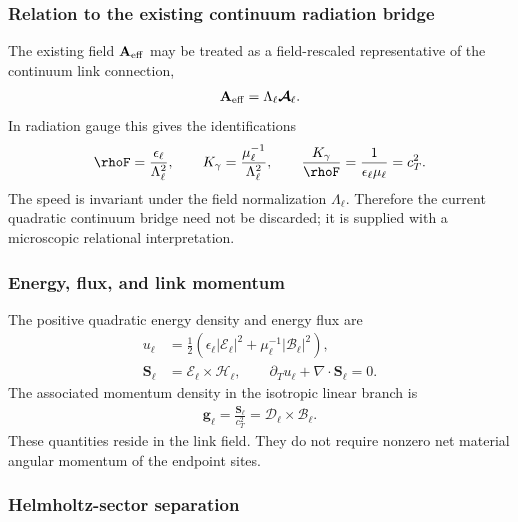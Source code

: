 \subsubsection{Relation to the existing continuum radiation bridge}

The existing field $\mathbf A_{\rm eff}$ may be treated as a field-rescaled
representative of the continuum link connection,
\begin{align}
    \mathbf A_{\rm eff}
    =
    \Lambda_\ell\boldsymbol{\mathcal A}_\ell.
\end{align}
In radiation gauge this gives the identifications
\begin{align}
    \rhoF
    =
    \frac{\epsilon_\ell}{\Lambda_\ell^2},
    \qquad
    K_\gamma
    =
    \frac{\mu_\ell^{-1}}{\Lambda_\ell^2},
    \qquad
    \frac{K_\gamma}{\rhoF}
    =
    \frac{1}{\epsilon_\ell\mu_\ell}
    =c_T^2.
    \label{eq:rt_link_to_Aeff_normalization}
\end{align}
The speed is invariant under the field normalization $\Lambda_\ell$.  Therefore
the current quadratic continuum bridge need not be discarded; it is supplied
with a microscopic relational interpretation.

\subsubsection{Energy, flux, and link momentum}

The positive quadratic energy density and energy flux are
\begin{align}
    u_\ell
    &=
    \frac12
    \left(
        \epsilon_\ell|\boldsymbol{\mathcal E}_\ell|^2
        +
        \mu_\ell^{-1}|\boldsymbol{\mathcal B}_\ell|^2
    \right),
    \\
    \mathbf S_\ell
    &=
    \boldsymbol{\mathcal E}_\ell
    \times
    \boldsymbol{\mathcal H}_\ell,
    \qquad
    \partial_Tu_\ell+\nabla\cdot\mathbf S_\ell=0.
    \label{eq:rt_link_energy_flux}
\end{align}
The associated momentum density in the isotropic linear branch is
\begin{align}
    \mathbf g_\ell
    =
    \frac{\mathbf S_\ell}{c_T^2}
    =
    \boldsymbol{\mathcal D}_\ell
    \times
    \boldsymbol{\mathcal B}_\ell.
    \label{eq:rt_link_momentum_density}
\end{align}
These quantities reside in the link field.  They do not require nonzero net
material angular momentum of the endpoint sites.

\subsubsection{Helmholtz-sector separation}

